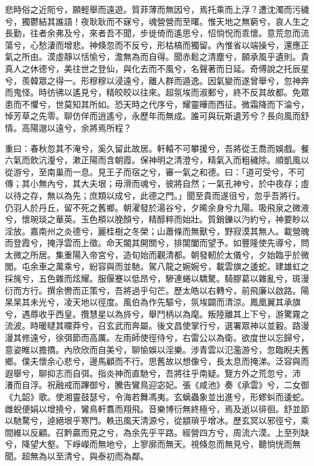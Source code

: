 
\begin{pinyinscope}
悲時俗之近阨兮，願輕舉而遠遊。質菲薄而無因兮，焉托乘而上浮？遭沈濁而污穢兮，獨鬱結其誰語！夜耿耿而不寐兮，魂營營而至曙。惟天地之無窮兮，哀人生之長勤，往者余弗及兮，來者吾不聞，步徙倚而遙思兮，怊惝怳而乖懷。意荒忽而流蕩兮，心愁淒而增悲。神倏忽而不反兮，形枯槁而獨留。內惟省以端操兮，還應正氣之所由。漠虛靜以恬愉兮，澹無為而自得。聞赤鬆之清塵兮，願承風乎遺則。貴真人之休德兮，美往世之登仙，與化去而不風兮，名聲著而日延。奇傅說之托辰星兮，羨韓眾之得一。形穆穆以浸遠兮，離人群而遁逸。因氣變而遂曾舉兮，忽神奔而鬼怪。時彷彿以遙見兮，精皎皎以往來。超氛埃而淑郵兮，終不反其故都。免眾患而不懼兮，世莫知其所如。恐天時之代序兮，耀靈曄而西征。微霜降而下淪兮，悼芳草之先零。聊仿佯而逍遙兮，永歷年而無成。誰可與玩斯遺芳兮？長向風而舒情。高陽邈以遠兮，余將焉所程？

重曰：春秋忽其不淹兮，奚久留此故居。軒轅不可攀援兮，吾將從王喬而娛戲。餐六氣而飲沆瀣兮，漱正陽而含朝霞。保神明之清澄兮，精氣入而粗穢除。順凱風以從游兮，至南巢而一息。見王子而宿之兮，審一氣之和德。曰：「道可受兮，不可傳；其小無內兮，其大夫垠；毋滑而魂兮，彼將自然；一氣孔神兮，於中夜存；虛以待之存，無以為先；庶類以成兮，此德之門。」聞至貴而遂徂兮，忽乎吾將行。仍羽人於丹丘，留不死之舊鄉。朝濯發於湯谷兮，夕晞余身兮九陽。吸飛泉之微液兮，懷琬琰之華英。玉色頩以脕顏兮，精醇粹而始壯。質銷鑠以汋約兮，神要眇以淫放。嘉南州之炎德兮，麗桂樹之冬榮；山蕭條而無獸兮，野寂漠其無人。載營魄而登霞兮，掩浮雲而上徵。命天閽其開關兮，排閶闔而望予。如豐隆使先導兮，問太微之所居。集重陽入帝宮兮，造旬始而觀清都。朝發軔於太儀兮，夕始臨乎於微閭。屯余車之萬乘兮，紛容與而並馳。駕八龍之婉婉兮，載雲旗之逶蛇。建雄虹之採旄兮，五色雜而炫耀。服偃蹇以低昂兮，驂連蜷以驕驁。騎膠葛以雜亂兮，斑漫衍而方行。撰余轡而正策兮，吾將過乎句芒。歷太皓以右轉兮，前飛廉以啟路。陽杲杲其未光兮，凌天地以徑度。風伯為作先驅兮，氛埃闢而清涼。鳳凰翼其承旗兮，遇蓐收乎西皇。攬慧星以為旍兮，舉鬥柄以為麾。叛陸離其上下兮，游驚霧之流波。時暖曃其曭莽兮，召玄武而奔屬。後文昌使掌行兮，選署眾神以並轂。路漫漫其修遠兮，徐弭節而高厲。左雨師使徑侍兮，右雷公以為衛。欲度世以忘歸兮，意姿睢以擔撟。內欣欣而自美兮，聊愉娛以淫樂。涉青雲以氾濫游兮，忽臨睨夫舊鄉。僕夫懷余心悲兮，邊馬顧而不行。思舊故以想像兮，長太息而掩涕。泛容與而遐舉兮，聊抑志而自弭。指炎神而直馳兮，吾將往乎南疑。覽方外之荒忽兮，沛𣶈瀁而自浮。祝融戒而蹕御兮，騰告鸞鳥迎宓妃。張《咸池》奏《承雲》兮，二女御《九韶》歌。使湘靈鼓瑟兮，令海若舞馮夷。玄螭蟲象並出進兮，形蟉虯而逶蛇。雌蜺便娟以增撓兮，鸞鳥軒翥而翔飛。音樂博衍無終極兮，焉及逝以徘徊。舒並節以馳騖兮，逴絕垠乎寒門。軼迅風天清源兮，從顓瑣乎增冰。歷玄冥以邪徑兮，乘間維以反顧。召黔贏而見之兮，為余先乎平路。經營四方兮，周流六漠。上至列缺兮，降望大壑。下崢嶸而無地兮，上寥廓而無天。視倏忽而無見兮，聽惝恍而無聞。超無為以至清兮，與泰初而為鄰。


\end{pinyinscope}